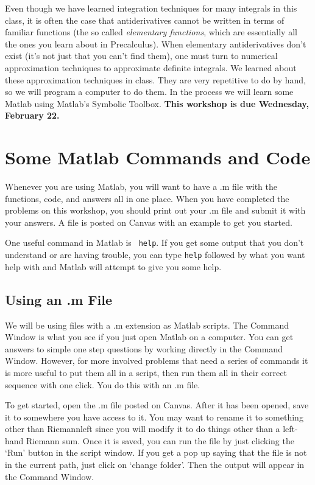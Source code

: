 \documentclass[letterpaper,11pt]{examPTP}
\begin{document}
\pagestyle{headandfoot}


\noindent \underline{\hspace{6.5in}}

Even though we have learned integration techniques for many integrals in this class, it is often the case that antiderivatives cannot be written in terms of familiar functions (the so called {\it elementary functions}, which are essentially all the ones you learn about in Precalculus). When elementary antiderivatives don't exist (it's not just that you can't find them), one must turn to numerical approximation techniques to approximate definite integrals. We learned about these approximation techniques in class. They are very repetitive to do by hand, so we will program a computer to do them. In the process we will learn some Matlab using Matlab's Symbolic Toolbox. {\bf  This workshop is due Wednesday, February 22.}

\begin{center}
\addpoints
\gradetable[h]  
\end{center}
\workshopinstructions

\section*{Some Matlab Commands and Code}
Whenever you are using Matlab, you will want to have a .m file with the functions, code, and answers all in one place. When you have completed the problems on this workshop, you should print out your .m file and submit it with your answers. A file is posted on Canvas with an example to get you started.
\par 
One useful command in Matlab is \verb! help!. If you get some output that you don't understand or are having trouble, you can type \verb!help! followed by what you want help with and Matlab will attempt to give you some help.

\subsection*{Using an .m File}
We will be using files with a .m extension as Matlab scripts. The Command Window is what you see if you just open Matlab on a computer. You can get answers to simple one step questions by working directly in the Command Window. However, for more involved problems that need a series of commands it is more useful to put them all in a script, then run them all in their correct sequence with one click. You do this with an .m file.
\par
To get started, open the .m file posted on Canvas. After it has been opened, save it to somewhere you have access to it. You may want to rename it to something other than Riemann\textunderscore left since you will modify it to do things other than a left-hand Riemann sum. Once it is saved, you can run the file by just clicking the `Run' button in the script window. If you get a pop up saying that the file is not in the current path, just click on `change folder'. Then the output will appear in the Command Window.    
\end{document}
